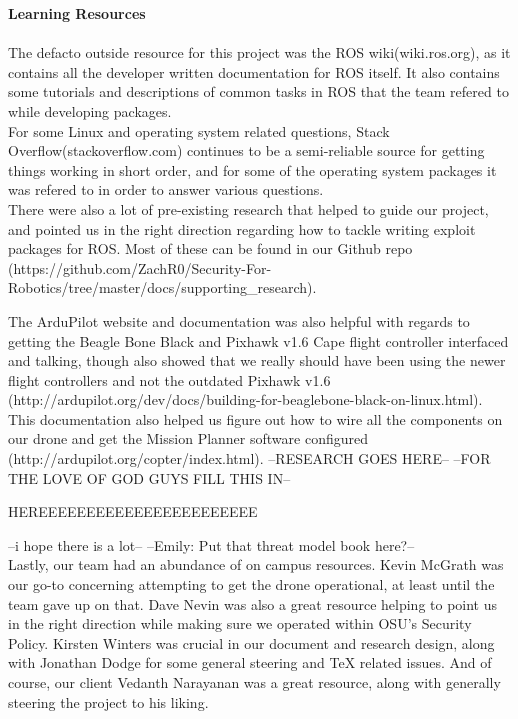 \documentclass[IEEEtran,letterpaper,10pt,notitlepage,draftclsnofoot,onecolumn]{article}
\begin{document}
\LARGE\textbf{Learning Resources\\ \\}\normalsize
The defacto outside resource for this project was the ROS wiki\cite{ROSWIKI}(wiki.ros.org), as it
contains all the developer written documentation for ROS itself. It also
contains some tutorials and descriptions of common tasks in ROS that the
team refered to while developing packages.\\
For some Linux and operating system related questions, Stack Overflow\cite{SO}(stackoverflow.com)
continues to be a semi-reliable source for getting things working in short order, and
for some of the operating system packages it was refered to in order to answer
various questions.\\
There were also a lot of pre-existing research that helped to guide our project, and pointed us in the right
direction regarding how to tackle writing exploit packages for ROS. Most of these can be found in our Github
repo \cite{GitRepoSupporting}(https://github.com/ZachR0/Security-For-Robotics/tree/master/docs/supporting_research).

The ArduPilot website and documentation was also helpful with regards to getting the Beagle Bone Black and
Pixhawk v1.6 Cape flight controller interfaced and talking, though also showed that we really should have been
using the newer flight controllers and not the outdated Pixhawk v1.6 \cite{ArduProjectDevDocs}(http://ardupilot.org/dev/docs/building-for-beaglebone-black-on-linux.html). This
documentation also helped us figure out how to wire all the components on our drone and get the Mission Planner software configured \cite{ArduProjectDocs}(http://ardupilot.org/copter/index.html).
--RESEARCH GOES HERE--
--FOR THE LOVE OF GOD GUYS FILL THIS IN--




HEREEEEEEEEEEEEEEEEEEEEEEE




--i hope there is a lot--
--Emily: Put that threat model book here?--\\
Lastly, our team had an abundance of on campus resources. Kevin McGrath was our go-to
concerning attempting to get the drone operational, at least until the team gave up on
that. Dave Nevin was also a great resource helping to point us in the right direction while making sure
we operated within OSU's Security Policy.
Kirsten Winters was crucial in our document and research design, along with Jonathan
Dodge for some general steering and TeX related issues. And of course, our client Vedanth
Narayanan was a great resource, along with generally steering the project to his liking.
\end{document}
